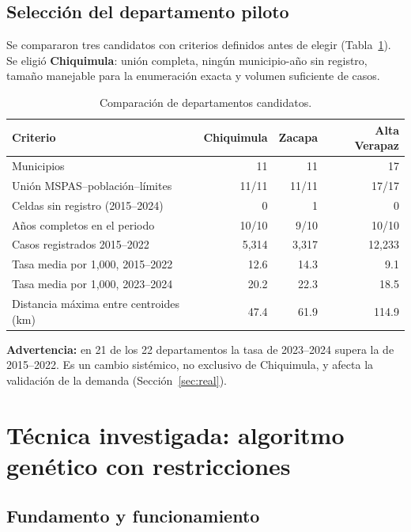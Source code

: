 \documentclass[11pt,letterpaper]{article}
\begin{document}
\subsection{Selección del departamento piloto}

Se compararon tres candidatos con criterios definidos antes de elegir (Tabla~\ref{tab:depto}). Se eligió \textbf{Chiquimula}: unión completa, ningún municipio-año sin registro, tamaño manejable para la enumeración exacta y volumen suficiente de casos.

\begin{table}[htbp]
\centering
\small
\begin{tabular}{lrrr}
\toprule
Criterio & \textbf{Chiquimula} & Zacapa & Alta Verapaz \\
\midrule
Municipios & 11 & 11 & 17 \\
Unión MSPAS--población--límites & 11/11 & 11/11 & 17/17 \\
Celdas sin registro (2015--2024) & 0 & 1 & 0 \\
Años completos en el periodo & 10/10 & 9/10 & 10/10 \\
Casos registrados 2015--2022 & 5{,}314 & 3{,}317 & 12{,}233 \\
Tasa media por 1{,}000, 2015--2022 & 12.6 & 14.3 & 9.1 \\
Tasa media por 1{,}000, 2023--2024 & 20.2 & 22.3 & 18.5 \\
Distancia máxima entre centroides (km) & 47.4 & 61.9 & 114.9 \\
\bottomrule
\end{tabular}
\caption{Comparación de departamentos candidatos.}
\label{tab:depto}
\end{table}

\textbf{Advertencia:} en 21 de los 22 departamentos la tasa de 2023--2024 supera la de 2015--2022. Es un cambio sistémico, no exclusivo de Chiquimula, y afecta la validación de la demanda (Sección~\ref{sec:real}).

\section{Técnica investigada: algoritmo genético con restricciones}
\label{sec:tecnica}

\subsection{Fundamento y funcionamiento}
\end{document}

